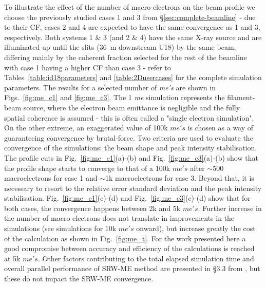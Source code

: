 \documentclass{iucr}              %
\begin{document}
To illustrate the effect of the number of macro-electrons on the beam profile we choose the previously studied cases 1 and 3 from \S\ref{sec:complete-beamline} - due to their CF, cases 2 and 4 are expected to have the same convergence as 1 and 3, respectively. Both systems 1 \& 3 (and 2 \& 4) have the same X-ray source and are illuminated up until the slits (36~m downstream U18) by the same beam, differing mainly by the coherent fraction selected for the rest of the beamline with case 1 having a higher CF than case 3 - refer to Tables~\ref{table:id18parameters} and \ref{table:2Dusercases} for the complete simulation parameters. The results for a selected number of \textit{me's} are shown in Figs.~\ref{fig:me_c1} and \ref{fig:me_c3}. The 1 \textit{me} simulation represents the filament-beam source, where the electron beam emittance is negligible and the fully spatial coherence is assumed - this is often called a "single electron simulation". On the other extreme, an exaggerated value of 100k $me's$ is chosen as a way of guaranteeing convergence by brutal-force. Two criteria are used to evaluate the convergence of the simulations: the beam shape and peak intensity stabilisation. The profile cuts in  Fig.~\ref{fig:me_c1}(a)-(b) and Fig.~\ref{fig:me_c3}(a)-(b) show that the profile shape starts to converge to that of a 100k $me's$ after $\sim$500 macroelectrons for case 1 and $\sim$1k macroelectrons for case 3. Beyond that, it is necessary to resort to the relative error standard deviation and the peak intensity stabilisation. Fig.~\ref{fig:me_c1}(c)-(d) and Fig.~\ref{fig:me_c3}(c)-(d) show that for both cases, the convergence happens between 2k and 5k $me's$. Further increase in the number of macro electrons does not translate in improvements in the simulations (see simulations for 10k $me's$ onward), but increase greatly the cost of the calculation as shown in Fig.~\ref{fig:me_t}. For the work presented here a good compromise between accuracy and efficiency of the calculations is reached at 5k $me's$. Other factors contributing to the total elapsed simulation time and overall parallel performance of SRW-ME method are presented in \S3.3 from \cite{codeSRW_MEscan}, but these do not impact the SRW-ME convergence.
\end{document}
